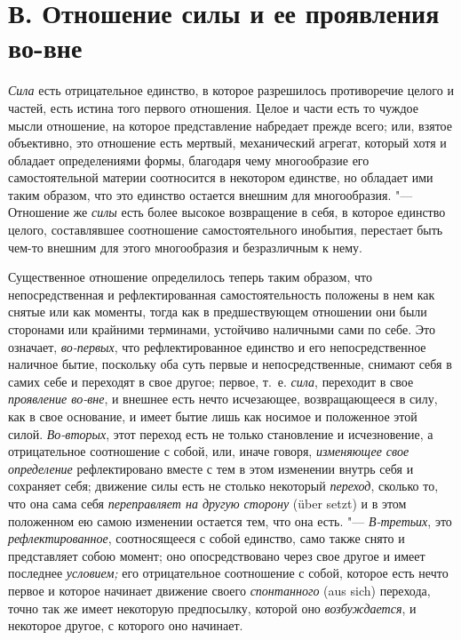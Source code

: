 \section[В. Отношение силы и ее проявления во-вне]
{В. Отношение силы и ее проявления во-вне}

{\em Сила} есть
отрицательное единство, в которое разрешилось противоречие целого и частей,
есть истина того первого отношения. Целое и части есть то чуждое мысли
отношение, на которое представление набредает прежде всего; или, взятое
объективно, это отношение есть мертвый, механический агрегат, который хотя
и обладает определениями формы, благодаря чему многообразие его
самостоятельной материи соотносится в некотором единстве, но обладает ими
таким образом, что это единство остается внешним для многообразия. "---
Отношение же {\em силы} есть более высокое возвращение
в себя, в которое единство целого, составлявшее соотношение
самостоятельного инобытия, перестает быть чем-то внешним для этого
многообразия и безразличным к нему.

Существенное отношение определилось теперь таким образом, что
непосредственная и рефлектированная самостоятельность положены в
нем
как снятые или как моменты, тогда как в предшествующем отношении они были
сторонами или крайними терминами, устойчиво наличными сами по себе. Это
означает, {\em во-первых}, что рефлектированное
единство и его непосредственное наличное бытие, поскольку оба суть первые и
непосредственные, снимают себя в самих себе и переходят в свое другое;
первое, т.~е. {\em сила}, переходит в свое
{\em проявление во-вне}, и внешнее есть нечто
исчезающее, возвращающееся в силу, как в свое основание, и имеет бытие лишь
как носимое и положенное этой силой. {\em Во-вторых},
этот переход есть не только становление и исчезновение, а отрицательное
соотношение с собой, или, иначе говоря, {\em изменяющее
свое определение} рефлектировано вместе с тем в этом изменении внутрь себя
и сохраняет себя; движение силы есть не столько некоторый
{\em переход}, сколько то, что она сама себя
{\em переправляет на другую сторону} (über setzt) и в
этом положенном ею самою изменении остается тем, что она есть. "---
{\em В-третьих}, это {\em рефлектированное}, соотносящееся с собой единство,
само также снято и представляет собою момент; оно опосредствовано через
свое другое и имеет последнее {\em условием;} его
отрицательное соотношение с собой, которое есть нечто первое и которое
начинает движение своего {\em спонтанного} (aus sich) перехода,
точно так же имеет некоторую предпосылку, которой оно
{\em возбуждается}, и некоторое другое, с которого оно начинает.


